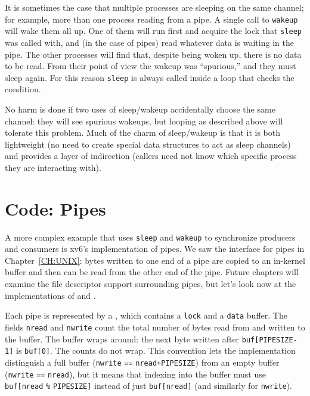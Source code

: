 It is sometimes the case that multiple processes are sleeping
on the same channel; for example, more than one process
reading from a pipe.
A single call to 
\lstinline{wakeup}
will wake them all up.
One of them will run first and acquire the lock that
\lstinline{sleep}
was called with, and (in the case of pipes) read whatever
data is waiting in the pipe.
The other processes will find that, despite being woken up,
there is no data to be read.
From their point of view the wakeup was ``spurious,'' and
they must sleep again.
For this reason \lstinline{sleep} is always called inside a loop that
checks the condition.

No harm is done if two uses of sleep/wakeup accidentally
choose the same channel: they will see spurious wakeups,
but looping as described above will tolerate this problem.
Much of the charm of sleep/wakeup is that it is both
lightweight (no need to create special data
structures to act as sleep channels) and provides a layer
of indirection (callers need not know which specific process
they are interacting with).
\section{Code: Pipes}
A more complex example that uses \lstinline{sleep}
and \lstinline{wakeup} to synchronize producers and
consumers is xv6's implementation of pipes.
We saw the interface for pipes in Chapter~\ref{CH:UNIX}:
bytes written to one end of a pipe are copied
to an in-kernel buffer and then can be read from
the other end of the pipe.
Future chapters will examine the file descriptor support
surrounding pipes, but let's look now at the
implementations of 
and
.

Each pipe
is represented by a 
,
which contains
a 
\lstinline{lock}
and a 
\lstinline{data}
buffer.
The fields
\lstinline{nread}
and
\lstinline{nwrite}
count the total number of bytes read from
and written to the buffer.
The buffer wraps around:
the next byte written after
\lstinline{buf[PIPESIZE-1]}
is 
\lstinline{buf[0]}.
The counts do not wrap.
This convention lets the implementation
distinguish a full buffer 
(\lstinline{nwrite}
\lstinline{==}
\lstinline{nread+PIPESIZE})
from an empty buffer
(\lstinline{nwrite}
\lstinline{==}
\lstinline{nread}),
but it means that indexing into the buffer
must use
\lstinline{buf[nread}
\lstinline{%}
\lstinline{PIPESIZE]}
instead of just
\lstinline{buf[nread]} 
(and similarly for
\lstinline{nwrite}).

